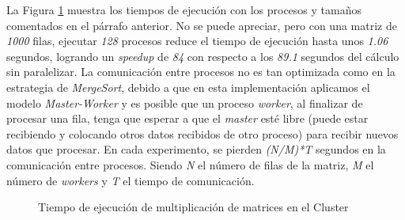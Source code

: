 		La Figura \ref{fig:mult_matrices_cluster} muestra los tiempos de ejecución con los procesos y tamaños comentados en el párrafo anterior. No se puede apreciar, pero con una matriz de \textit{1000} filas, ejecutar \textit{128} procesos reduce el tiempo de ejecución hasta unos \textit{1.06} segundos, logrando un \textit{speedup} de \textit{84} con respecto a los \textit{89.1} segundos del cálculo sin paralelizar. La comunicación entre procesos no es tan optimizada como en la estrategia de \textit{MergeSort}, debido a que en esta implementación aplicamos el modelo \textit{Master-Worker} y es posible que un proceso \textit{worker}, al finalizar de procesar una fila, tenga que esperar a que el \textit{master} esté libre (puede estar recibiendo y colocando otros datos recibidos de otro proceso) para recibir nuevos datos que procesar. En cada experimento, se pierden \textit{(N/M)*T} segundos en la comunicación entre procesos. Siendo \textit{N} el número de filas de la matriz, \textit{M} el número de \textit{workers} y \textit{T} el tiempo de comunicación.

		\begin{figure}[!h]
			\hspace{-0.07\textwidth} 
			\caption{Tiempo de ejecución de multiplicación de matrices en el Cluster}
			\label{fig:mult_matrices_cluster}
		\end{figure}
		
